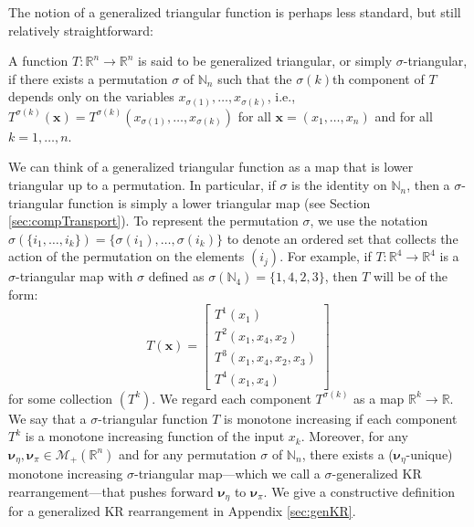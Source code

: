 \documentclass[twoside,11pt]{article}
\newcommand{\borelm}{\mathscr{M}}
\newcommand{\borelmp}{\borelm_+}
\newcommand{\genm}{\boldsymbol{\nu} }   %
\newcommand{\re}{\mathbb{R}}
\newcommand{\ra}{\rightarrow}
\newcommand{\xb}{\boldsymbol{x}}
\begin{document}
%
%
%
The notion of a generalized triangular function is perhaps less
standard, but still relatively straightforward:
\begin{definition} \label{def:genTri} 
  A
  function $T:\re^n\ra\re^n$ is said to be generalized triangular, or
  simply $\sigma$-triangular, if there exists a permutation $\sigma$
  of $\mathbb{N}_n$ such that the $\sigma(k)$th
  component of $T$ depends only on 
  the variables
  $x_{\sigma(1)},\ldots,x_{\sigma(k)}$,
  i.e., $T^{\sigma(k)}(\xb)=T^{\sigma(k)}(x_{\sigma(1)},\ldots,x_{\sigma(k)})$ for all
  $\xb=(x_1,\ldots,x_n)$ and for all $k=1,\ldots,n$.
\end{definition}
%
We can think of a generalized triangular function as a map that is
lower triangular up to a permutation. 
In particular, if $\sigma$ is the identity on $\mathbb{N}_n$, then a $\sigma$-triangular function
is simply a lower triangular map (see Section \ref{sec:compTransport}).
To represent the permutation $\sigma$,
we use the notation $\sigma(\{ i_1 ,\ldots , i_k \})=\{ \sigma(i_1) , \ldots , \sigma(i_k) \}$
to denote an ordered set that collects the action of the permutation
on the %
elements $(i_j)$. 
For example, if $T:\re^4\ra\re^4$ is a
$\sigma$-triangular map with $\sigma$ defined as $\sigma( \mathbb{N}_4 )=\{ 1,4,2,3 \} $,
then
%
$T$ will be of the form:
\begin{equation}  \label{eq:genTriMap}
T( \xb ) = \left[\begin{array}{l}
T^1(x_1)\\ 
T^2(x_1,x_4,x_2)\\ 
T^3(x_1,x_4, x_2, x_3) \\ 
T^4(x_1,x_4)
\end{array}\right]%
\end{equation}
%
for some collection $(T^k)$. 
We regard each component $T^{\sigma(k)}$ as a map %
$\re^k \ra \re$.
%
%
%
%
%
%
%
%
%
%
%
%
%
%
%
%
%
%
We say that a $\sigma$-triangular function 
%
$T$ is monotone increasing if 
each component $T^k$ is a monotone increasing
function of the input $x_k$.
%
%
%
Moreover, for any 
%
$\genm_{\eta}, \genm_{\pi} \in \borelmp(\re^n)$
%
%
and for any permutation $\sigma$ of $\mathbb{N}_n$, there
exists a 
($\genm_\eta$-unique) monotone increasing $\sigma$-triangular
map---which we call a
$\sigma$-generalized
KR rearrangement---that
pushes forward 
%
$\genm_{\eta}$ to
$\genm_{\pi}$.
We give a 
%
constructive
definition for a generalized
KR rearrangement in Appendix \ref{sec:genKR}.
%
%
\end{document}
